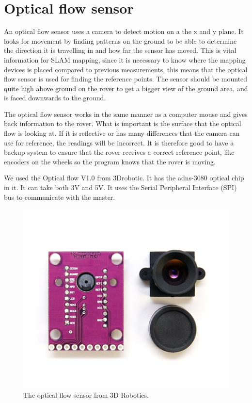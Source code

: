 \clearpage
\section{Optical flow sensor}

An optical flow sensor uses a camera to detect motion on a the x and y plane. It looks for movement by finding patterns on the ground to be able to determine the direction it is travelling in and how far the sensor has moved. This is vital information for SLAM mapping, since it is necessary to know where the mapping devices is placed compared to previous measurements, this means that the optical flow sensor is used for finding the reference points. The sensor should be mounted quite high above ground on the rover to get a bigger view of the ground area, and is faced downwards to the ground.%

The optical flow sensor works in the same manner as a computer mouse and gives back information to the rover. What is important is the surface that the optical flow is looking at. If it is reflective or has many differences that the camera can use for reference, the readings will be incorrect. It is therefore good to have a backup system to ensure that the rover receives a correct reference point, like encoders on the wheels so the program knows that the rover is moving.

We used the Optical flow V1.0 from 3Drobotic. It has the adns-3080 optical chip in it. It can take both 3V and 5V. It uses the Serial Peripheral Interface (SPI) bus to communicate with the master.  

\begin{figure}[H]
	\centering
	\includegraphics[width=.3\linewidth]{images/optical.jpg}
	\caption{The optical flow sensor from 3D Robotics.}
\end{figure}

